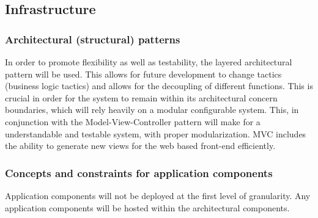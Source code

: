 \documentclass{article}
\begin{document}
	\subsection{Infrastructure}

	\subsubsection{Architectural (structural) patterns}
	In order to promote flexibility as well as testability, the layered architectural pattern will be used. This allows for future development to change tactics (business logic tactics) and allows for the decoupling of different functions. This is crucial in order for the system to remain within its architectural concern boundaries, which will rely heavily on a modular configurable system. This, in conjunction with the Model-View-Controller pattern will make for a understandable and testable system, with proper modularization. MVC includes the ability to generate new views for the web based front-end efficiently. 
	\subsubsection{Concepts and constraints for application components}

	Application components will not be deployed at the first level of granularity. Any application components will be hosted within the architectural components.


	
\end{document}
